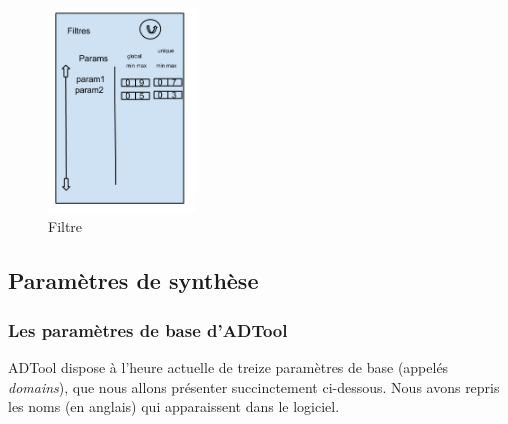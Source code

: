 		\begin{figure}[h!]
			\begin{center}
				\includegraphics[width=0.35\textwidth]{figure/filtre.png}
			\end{center}
			\caption{Filtre}
			\label{fig:filtre}
		\end{figure}

\subsection{Paramètres de synthèse}

\subsubsection{Les paramètres de base d'ADTool}

ADTool dispose à l'heure actuelle de treize paramètres de base (appelés \textit{domains}), que nous allons présenter succinctement ci-dessous. Nous avons repris les noms (en anglais) qui apparaissent dans le logiciel. 
		
